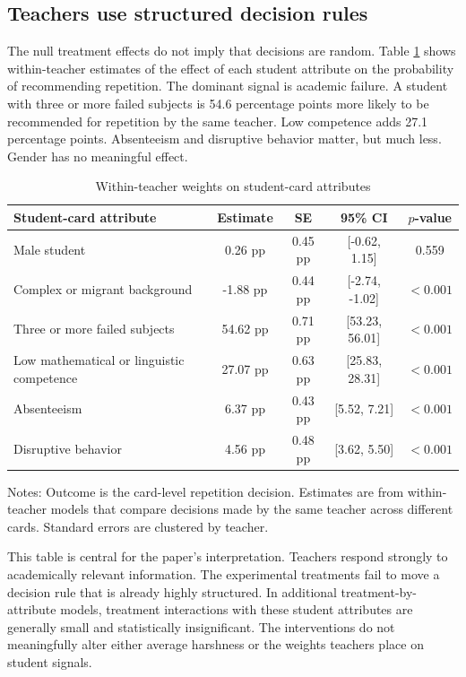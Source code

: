 \documentclass[12pt,a4paper]{article}
\newcommand{\ci}[2]{[#1, #2]}
\begin{document}
\subsection{Teachers use structured decision rules}

The null treatment effects do not imply that decisions are random. Table \ref{tab:attributes} shows within-teacher estimates of the effect of each student attribute on the probability of recommending repetition. The dominant signal is academic failure. A student with three or more failed subjects is 54.6 percentage points more likely to be recommended for repetition by the same teacher. Low competence adds 27.1 percentage points. Absenteeism and disruptive behavior matter, but much less. Gender has no meaningful effect.

\begin{table}[!htbp]
\centering
\caption{Within-teacher weights on student-card attributes}
\label{tab:attributes}
\begin{threeparttable}
\begin{tabular}{lcccc}
\toprule
Student-card attribute & Estimate & SE & 95\% CI & \(p\)-value \\
\midrule
Male student & 0.26 pp & 0.45 pp & \ci{-0.62}{1.15} & 0.559 \\
Complex or migrant background & -1.88 pp & 0.44 pp & \ci{-2.74}{-1.02} & \(<0.001\) \\
Three or more failed subjects & 54.62 pp & 0.71 pp & \ci{53.23}{56.01} & \(<0.001\) \\
Low mathematical or linguistic competence & 27.07 pp & 0.63 pp & \ci{25.83}{28.31} & \(<0.001\) \\
Absenteeism & 6.37 pp & 0.43 pp & \ci{5.52}{7.21} & \(<0.001\) \\
Disruptive behavior & 4.56 pp & 0.48 pp & \ci{3.62}{5.50} & \(<0.001\) \\
\bottomrule
\end{tabular}
\begin{tablenotes}[flushleft]
\footnotesize
\item Notes: Outcome is the card-level repetition decision. Estimates are from within-teacher models that compare decisions made by the same teacher across different cards. Standard errors are clustered by teacher.
\end{tablenotes}
\end{threeparttable}
\end{table}

This table is central for the paper's interpretation. Teachers respond strongly to academically relevant information. The experimental treatments fail to move a decision rule that is already highly structured. In additional treatment-by-attribute models, treatment interactions with these student attributes are generally small and statistically insignificant. The interventions do not meaningfully alter either average harshness or the weights teachers place on student signals.
\end{document}
